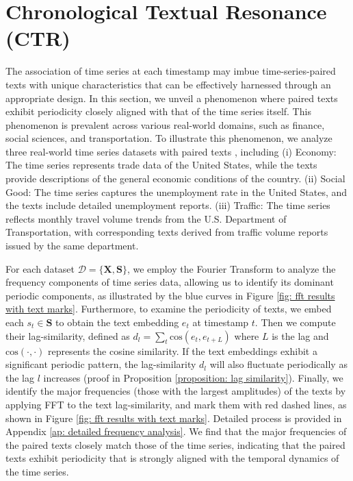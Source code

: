 \section{Chronological Textual Resonance (CTR)}
The association of time series at each timestamp may imbue time-series-paired texts with unique characteristics that can be effectively harnessed through an appropriate design. In this section, we unveil a phenomenon where paired texts exhibit periodicity closely aligned with that of the time series itself. This phenomenon is prevalent across various real-world domains, such as finance, social sciences, and transportation.
To illustrate this phenomenon, we analyze three real-world time series datasets with paired texts \cite{DBLP:journals/corr/abs-2406-08627}, including  
(i) Economy: The time series represents trade data of the United States, while the texts provide descriptions of the general economic conditions of the country. (ii) Social Good: The time series captures the unemployment rate in the United States, and the texts include detailed unemployment reports. (iii) Traffic: The time series reflects monthly travel volume trends from the U.S. Department of Transportation, with corresponding texts derived from traffic volume reports issued by the same department.


For each dataset $\mathcal{D} = \{\bm{X}, \bm{S}\}$, we employ the Fourier Transform \cite{nussbaumer1982fast, sneddon1995fourier} to analyze the frequency components of time series data, allowing us to identify its dominant periodic components, as illustrated by the blue curves in Figure \ref{fig: fft results with text marks}. Furthermore, to examine the periodicity of texts, we embed each $s_t \in \bm{S}$ to obtain the text embedding $e_t$ at timestamp $t$. Then we compute their lag-similarity, defined as $d_l = \sum_t \mathrm{cos}(e_t, e_{t+L})$ where $L$ is the lag and $\mathrm{cos}(\cdot, \cdot)$ represents the cosine similarity. If the text embeddings exhibit a significant periodic pattern, the lag-similarity $d_l$ will also fluctuate periodically as the lag $l$ increases (proof in Proposition \ref{proposition: lag similarity}). Finally, we identify the major frequencies (those with the largest amplitudes) of the texts by applying FFT to the text lag-similarity, and mark them with red dashed lines, as shown in Figure \ref{fig: fft results with text marks}. Detailed process is provided in  Appendix \ref{ap: detailed frequency analysis}. We find that the major frequencies of the paired texts closely match those of the time series, indicating that the paired texts exhibit periodicity that is strongly aligned with the temporal dynamics of the time series.




